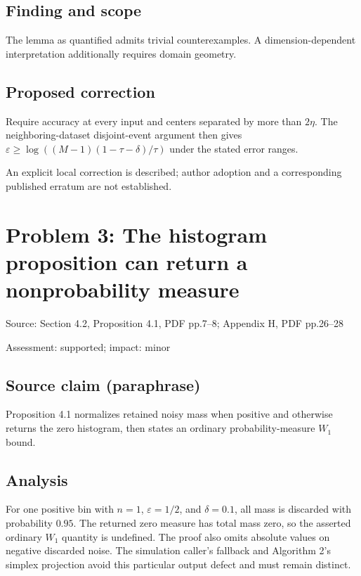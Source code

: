 \documentclass[11pt]{article}
\begin{document}
\subsection*{Finding and scope}

The lemma as quantified admits trivial counterexamples. A dimension-dependent interpretation additionally requires domain geometry.

\subsection*{Proposed correction}

Require accuracy at every input and centers separated by more than \(2\eta\). The neighboring-dataset disjoint-event argument then gives \(\varepsilon\geq\log((M-1)(1-\tau-\delta)/\tau)\) under the stated error ranges.

An explicit local correction is described; author adoption and a corresponding published erratum are not established.

\section*{Problem 3: The histogram proposition can return a nonprobability measure}

Source: Section 4.2, Proposition 4.1, PDF pp.7–8; Appendix H, PDF pp.26–28

Assessment: supported; impact: minor

\subsection*{Source claim (paraphrase)}

Proposition 4.1 normalizes retained noisy mass when positive and otherwise returns the zero histogram, then states an ordinary probability-measure \(W_1\) bound.

\subsection*{Analysis}

For one positive bin with \(n=1\), \(\varepsilon=1/2\), and \(\delta=0.1\), all mass is discarded with probability \(0.95\). The returned zero measure has total mass zero, so the asserted ordinary \(W_1\) quantity is undefined. The proof also omits absolute values on negative discarded noise. The simulation caller’s fallback and Algorithm 2’s simplex projection avoid this particular output defect and must remain distinct.
\end{document}
